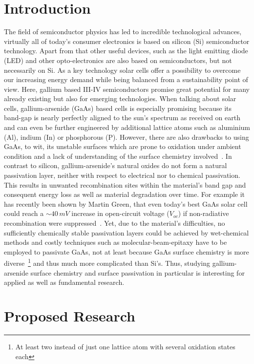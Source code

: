 \documentclass[a4paper]{article}
\begin{document}
\section*{Introduction}
The field of semiconductor physics has led to incredible technological advances, virtually all of today's consumer electronics is based on silicon (Si) semiconductor technology. Apart from that other useful devices, such as the light emitting diode (LED) and other opto-electronics are also based on semiconductors, but not necessarily on Si. As a key technology solar cells offer a possibility to overcome our increasing energy demand while being balanced from a sustainability point of view. Here, gallium based III-IV semiconductors promise great potential for many already existing but also for emerging technologies. When talking about solar cells, gallium-arsenide (GaAs) based cells is especially promising because its band-gap is nearly perfectly aligned to the sun's spectrum as received on earth and can even be further engineered by additional lattice atoms such as aluminium (Al), indium (In) or phosphorous (P). However, there are also drawbacks to using GaAs, to wit, its unstable surfaces which are prone to oxidation under ambient condition and a lack of understanding of the surface chemistry involved~\cite{review}. In contrast to silicon, gallium-arsenide's natural oxides do not form a natural passivation layer, neither with respect to electrical nor to chemical passivation. This results in unwanted recombination sites within the material's band gap and consequent energy loss as well as material degradation over time. For example it has recently been shown by Martin Green, that even today's best GaAs solar cell could reach a $\sim 40\, mV$ increase in open-circuit voltage ($V_{oc}$) if non-radiative recombination were suppressed~\cite{green}. Yet, due to the material's difficulties, no sufficiently chemically stable passivation layers could be achieved by wet-chemical methods and costly techniques such as molecular-beam-epitaxy have to be employed to passivate GaAs, not at least because GaAs surface chemistry is more diverse~\footnote{At least two instead of just one lattice atom with several oxidation states each} and thus much more complicated than Si's. Thus, studying gallium-arsenide surface chemistry and surface passivation in particular is interesting for applied as well as fundamental research.
\section*{Proposed Research}
\end{document}
